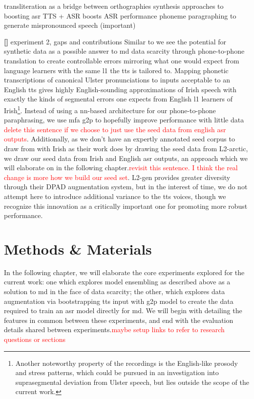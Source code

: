 \documentclass[thesis]{cluu}
\newcounter{paranum}
\newcommand{\numberedparagraph}{\par\refstepcounter{paranum}\textbf{[\theparanum] }}
\newcommand{\todo}[1]{\textcolor{red}{#1}}
\begin{document}
\textcite{khareLowResourceASR2021a} transliteration as a bridge between orthographies
\textcite{korzekwaComputerassistedPronunciationTraining2022} synthesis approaches to boosting asr
\textcite{barteldsMakingMoreLittle2023} TTS + ASR boosts ASR performance
\textcite{zhangL2GENNeuralPhoneme2022} phoneme paragraphing to generate mispronounced speech (important)
\numberedparagraph{experiment 2, gaps and contributions}
Similar to \textcite{zhangL2GENNeuralPhoneme2022} we see the potential for synthetic data as a possible answer to \gls{md} data scarcity through phone-to-phone translation to create controllable errors mirroring what one would expect from language learners with the same \gls{l1} the \gls{tts} is tailored to. Mapping phonetic transcriptions of canonical Ulster pronunciations to inputs acceptable to an English \gls{tts} gives highly English-sounding approximations of Irish speech with exactly the kinds of segmental errors one expects from English \gls{l1} learners of Irish\footnote{Another noteworthy property of the recordings is the English-like prosody and stress patterns, which could be pursued in an investigation into suprasegmental deviation from Ulster speech, but lies outside the scope of the current work.}. Instead of using a \gls{nn}-based architecture for our phone-to-phone paraphrasing, we use \gls{mfa} \gls{g2p} to hopefully improve performance with little data \todo{delete this sentence if we choose to just use the seed data from english asr outputs}. Additionally, as we don't have an expertly annotated seed corpus to draw from with Irish as their work does by drawing the seed data from L2-arctic, we draw our seed data from Irish and English \gls{asr} outputs, an approach which we will elaborate on in the following chapter.\todo{revisit this sentence. I think the real change is more how we build our seed set}. L2-gen provides greater diversity through their DPAD augmentation system, but in the interest of time, we do not attempt here to introduce additional variance to the \gls{tts} voices, though we recognize this innovation as a critically important one for promoting more robust performance.

\chapter{Methods \& Materials}
In the following chapter, we will elaborate the core experiments explored for the current work: one which explores model ensembling as described above as a solution to \gls{md} in the face of data scarcity; the other, which explores data augmentation via bootstrapping \gls{tts} input with \gls{g2p} model to create the data required to train an \gls{asr} model directly for \gls{md}. We will begin with detailing the features in common between these experiments, and end with the evaluation details shared between experiments.\todo{maybe setup links to refer to research questions or sections}
\end{document}
